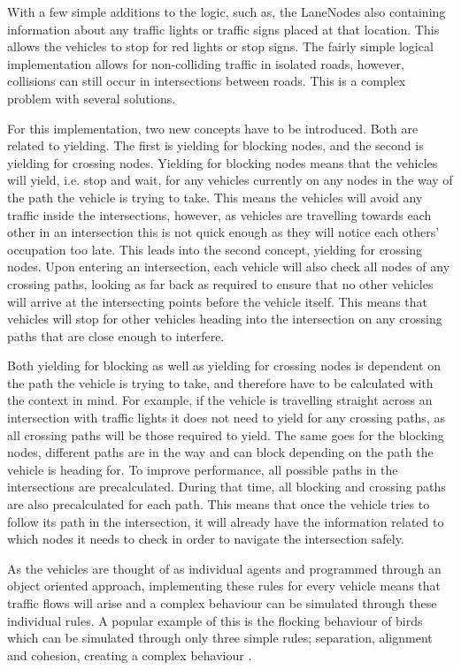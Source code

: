         With a few simple additions to the logic, such as, the LaneNodes also containing information about any traffic lights or traffic signs placed at that location. This allows the vehicles to stop for red lights or stop signs. The fairly simple logical implementation allows for non-colliding traffic in isolated roads, however, collisions can still occur in intersections between roads. This is a complex problem with several solutions.
    
        For this implementation, two new concepts have to be introduced. Both are related to yielding. The first is yielding for blocking nodes, and the second is yielding for crossing nodes. Yielding for blocking nodes means that the vehicles will yield, i.e. stop and wait, for any vehicles currently on any nodes in the way of the path the vehicle is trying to take. This means the vehicles will avoid any traffic inside the intersections, however, as vehicles are travelling towards each other in an intersection this is not quick enough as they will notice each others' occupation too late. This leads into the second concept, yielding for crossing nodes. Upon entering an intersection, each vehicle will also check all nodes of any crossing paths, looking as far back as required to ensure that no other vehicles will arrive at the intersecting points before the vehicle itself. This means that vehicles will stop for other vehicles heading into the intersection on any crossing paths that are close enough to interfere.
    
        Both yielding for blocking as well as yielding for crossing nodes is dependent on the path the vehicle is trying to take, and therefore have to be calculated with the context in mind. For example, if the vehicle is travelling straight across an intersection with traffic lights it does not need to yield for any crossing paths, as all crossing paths will be those required to yield. The same goes for the blocking nodes, different paths are in the way and can block depending on the path the vehicle is heading for. To improve performance, all possible paths in the intersections are precalculated. During that time, all blocking and crossing paths are also precalculated for each path. This means that once the vehicle tries to follow its path in the intersection, it will already have the information related to which nodes it needs to check in order to navigate the intersection safely.
    
        As the vehicles are thought of as individual agents and programmed through an object oriented approach, implementing these rules for every vehicle means that traffic flows will arise and a complex behaviour can be simulated through these individual rules. A popular example of this is the flocking behaviour of birds which can be simulated through only three simple rules; separation, alignment and cohesion, creating a complex behaviour \cite{flocking-behaviour}.

